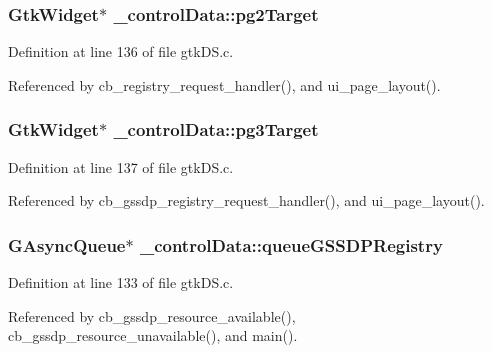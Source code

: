 \subsubsection[{pg2\+Target}]{\setlength{\rightskip}{0pt plus 5cm}Gtk\+Widget$\ast$ \+\_\+control\+Data\+::pg2\+Target}\label{struct__control_data_a201f826ab99699df83a85c5e4572ffb2}


Definition at line 136 of file gtk\+D\+S.\+c.



Referenced by cb\+\_\+registry\+\_\+request\+\_\+handler(), and ui\+\_\+page\+\_\+layout().

\hypertarget{struct__control_data_a67d45a0e9ba1fcaabea3600dfee830b9}{}
\subsubsection[{pg3\+Target}]{\setlength{\rightskip}{0pt plus 5cm}Gtk\+Widget$\ast$ \+\_\+control\+Data\+::pg3\+Target}\label{struct__control_data_a67d45a0e9ba1fcaabea3600dfee830b9}


Definition at line 137 of file gtk\+D\+S.\+c.



Referenced by cb\+\_\+gssdp\+\_\+registry\+\_\+request\+\_\+handler(), and ui\+\_\+page\+\_\+layout().

\hypertarget{struct__control_data_ad4c1f099018b51b0faeae870d284819d}{}
\subsubsection[{queue\+G\+S\+S\+D\+P\+Registry}]{\setlength{\rightskip}{0pt plus 5cm}G\+Async\+Queue$\ast$ \+\_\+control\+Data\+::queue\+G\+S\+S\+D\+P\+Registry}\label{struct__control_data_ad4c1f099018b51b0faeae870d284819d}


Definition at line 133 of file gtk\+D\+S.\+c.



Referenced by cb\+\_\+gssdp\+\_\+resource\+\_\+available(), cb\+\_\+gssdp\+\_\+resource\+\_\+unavailable(), and main().

\hypertarget{struct__control_data_adc74ddf3f6a7535eee87d39ed80ee7dd}{}

